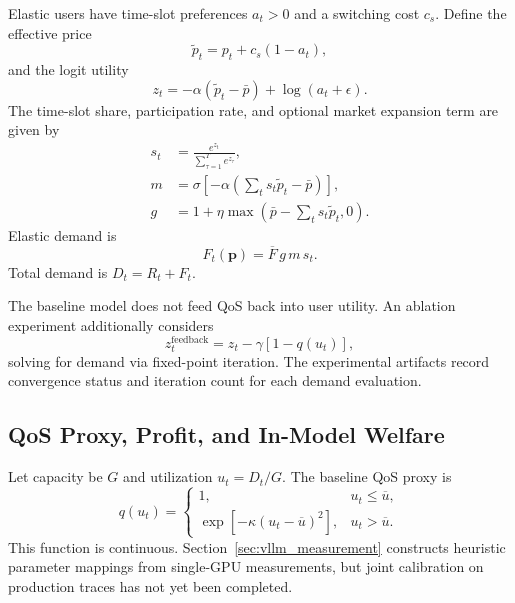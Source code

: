 \documentclass[11pt]{article}
\newcommand{\qos}{q}
\newcommand{\pcap}{\bar p}
\newcommand{\R}{R}
\newcommand{\F}{F}
\newcommand{\D}{D}
\begin{document}
Elastic users have time-slot preferences $a_t>0$ and a switching cost $c_s$.
Define the effective price
\begin{equation}
  \widetilde p_t=p_t+c_s(1-a_t),
\end{equation}
and the logit utility
\begin{equation}
  z_t=-\alpha(\widetilde p_t-\pcap)+\log(a_t+\epsilon).
  \label{eq:logit_z}
\end{equation}
The time-slot share, participation rate, and optional market expansion term
are given by
\begin{align}
  s_t &= \frac{e^{z_t}}{\sum_{\tau=1}^{T}e^{z_\tau}},\\
  m &= \sigma\!\left[-\alpha\left(\sum_t s_t\widetilde p_t-\pcap\right)\right],\\
  g &= 1+\eta\max\left(\pcap-\sum_t s_t\widetilde p_t,0\right).
\end{align}
Elastic demand is
\begin{equation}
  \F_t(\boldsymbol{p})=\overline{\F}\,g\,m\,s_t.
  \label{eq:flex}
\end{equation}
Total demand is $\D_t=\R_t+\F_t$.

The baseline model does not feed QoS back into user utility. An ablation
experiment additionally considers
\begin{equation}
  z_t^{\mathrm{feedback}}=z_t-\gamma[1-\qos(u_t)],
\end{equation}
solving for demand via fixed-point iteration. The experimental artifacts
record convergence status and iteration count for each demand evaluation.

\subsection{QoS Proxy, Profit, and In-Model Welfare}

Let capacity be $G$ and utilization $u_t=\D_t/G$. The baseline QoS proxy is
\begin{equation}
  \qos(u_t)=
  \begin{cases}
    1, & u_t\leq \overline u,\\
    \exp[-\kappa(u_t-\overline u)^2], & u_t>\overline u.
  \end{cases}
  \label{eq:qos}
\end{equation}
This function is continuous. Section~\ref{sec:vllm_measurement} constructs
heuristic parameter mappings from single-GPU measurements, but joint
calibration on production traces has not yet been completed.
\end{document}
